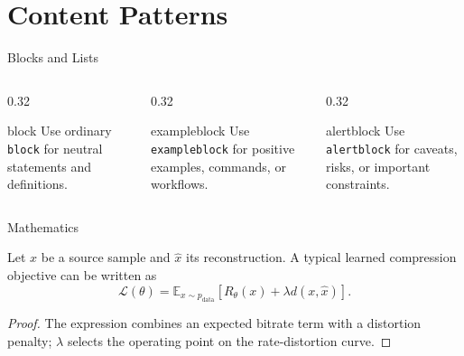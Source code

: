 \documentclass[aspectratio=169,10pt]{beamer}
\begin{document}
\section{Content Patterns}

\begin{academicframe}{Blocks and Lists}
  \begin{columns}[T,onlytextwidth]
    \begin{column}{0.32\textwidth}
      \begin{block}{block}
        \small
        Use ordinary \texttt{block} for neutral statements and definitions.
      \end{block}
    \end{column}
    \begin{column}{0.32\textwidth}
      \begin{exampleblock}{exampleblock}
        \small
        Use \texttt{exampleblock} for positive examples, commands, or workflows.
      \end{exampleblock}
    \end{column}
    \begin{column}{0.32\textwidth}
      \begin{alertblock}{alertblock}
        \small
        Use \texttt{alertblock} for caveats, risks, or important constraints.
      \end{alertblock}
    \end{column}
  \end{columns}
\end{academicframe}

\begin{academicframe}{Mathematics}
  \begin{theorem}
    Let $x$ be a source sample and $\hat{x}$ its reconstruction. A typical
    learned compression objective can be written as
    \[
      \mathcal{L}(\theta)=
      \mathbb{E}_{x\sim p_{\mathrm{data}}}
      \left[R_{\theta}(x)+\lambda d(x,\hat{x})\right].
    \]
  \end{theorem}

  \begin{proof}
    The expression combines an expected bitrate term with a distortion penalty;
    $\lambda$ selects the operating point on the rate-distortion curve.
  \end{proof}
\end{academicframe}
\end{document}
